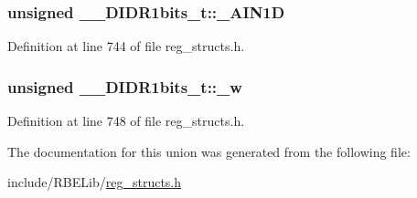 \hypertarget{union_____d_i_d_r1bits__t_a8c694a878fbec691810ff0f3081cfbd0}{
\subsubsection[{\+\_\+\+A\+I\+N1\+D}]{\setlength{\rightskip}{0pt plus 5cm}unsigned \+\_\+\+\_\+\+D\+I\+D\+R1bits\+\_\+t\+::\+\_\+\+A\+I\+N1\+D}}\label{union_____d_i_d_r1bits__t_a8c694a878fbec691810ff0f3081cfbd0}


Definition at line 744 of file reg\+\_\+structs.\+h.

\hypertarget{union_____d_i_d_r1bits__t_a4e7a332f9a400cffe49f593c4029b800}{
\subsubsection[{\+\_\+w}]{\setlength{\rightskip}{0pt plus 5cm}unsigned \+\_\+\+\_\+\+D\+I\+D\+R1bits\+\_\+t\+::\+\_\+w}}\label{union_____d_i_d_r1bits__t_a4e7a332f9a400cffe49f593c4029b800}


Definition at line 748 of file reg\+\_\+structs.\+h.



The documentation for this union was generated from the following file\+:\begin{DoxyCompactItemize}
\item 
include/\+R\+B\+E\+Lib/\hyperlink{reg__structs_8h}{reg\+\_\+structs.\+h}\end{DoxyCompactItemize}

